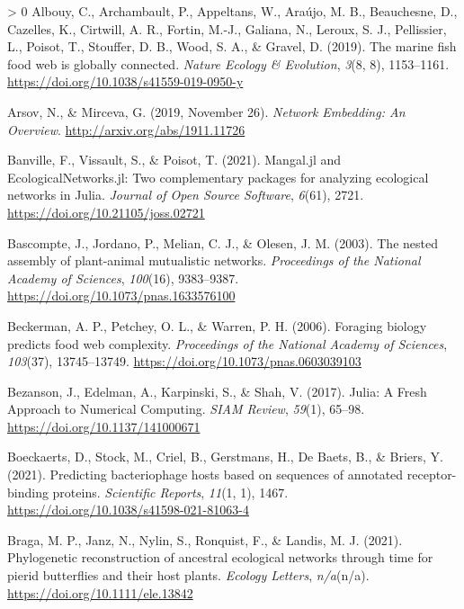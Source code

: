 \documentclass[11pt]{article}
\newlength{\cslhangindent}
\newenvironment{CSLReferences}[3] %
 {%
  \setlength{\parindent}{0pt}
  \ifodd #1 \everypar{\setlength{\hangindent}{\cslhangindent}}\ignorespaces\fi
  \ifnum #2 > 0
  \setlength{\parskip}{#2\baselineskip}
  \fi
 }%
 {}
\begin{document}
\hypertarget{refs}{}
\begin{CSLReferences}{1}{0}
\leavevmode\hypertarget{ref-Albouy2019MarFis}{}%
Albouy, C., Archambault, P., Appeltans, W., Araújo, M. B., Beauchesne,
D., Cazelles, K., Cirtwill, A. R., Fortin, M.-J., Galiana, N., Leroux,
S. J., Pellissier, L., Poisot, T., Stouffer, D. B., Wood, S. A., \&
Gravel, D. (2019). The marine fish food web is globally connected.
\emph{Nature Ecology \& Evolution}, \emph{3}(8, 8), 1153--1161.
\url{https://doi.org/10.1038/s41559-019-0950-y}

\leavevmode\hypertarget{ref-Arsov2019NetEmb}{}%
Arsov, N., \& Mirceva, G. (2019, November 26). \emph{Network Embedding:
An Overview}. \url{http://arxiv.org/abs/1911.11726}

\leavevmode\hypertarget{ref-Banville2021ManJl}{}%
Banville, F., Vissault, S., \& Poisot, T. (2021). Mangal.jl and
EcologicalNetworks.jl: Two complementary packages for analyzing
ecological networks in Julia. \emph{Journal of Open Source Software},
\emph{6}(61), 2721. \url{https://doi.org/10.21105/joss.02721}

\leavevmode\hypertarget{ref-Bascompte2003NesAss}{}%
Bascompte, J., Jordano, P., Melian, C. J., \& Olesen, J. M. (2003). The
nested assembly of plant-animal mutualistic networks. \emph{Proceedings
of the National Academy of Sciences}, \emph{100}(16), 9383--9387.
\url{https://doi.org/10.1073/pnas.1633576100}

\leavevmode\hypertarget{ref-Beckerman2006ForBio}{}%
Beckerman, A. P., Petchey, O. L., \& Warren, P. H. (2006). Foraging
biology predicts food web complexity. \emph{Proceedings of the National
Academy of Sciences}, \emph{103}(37), 13745--13749.
\url{https://doi.org/10.1073/pnas.0603039103}

\leavevmode\hypertarget{ref-Bezanson2017JulFre}{}%
Bezanson, J., Edelman, A., Karpinski, S., \& Shah, V. (2017). Julia: A
Fresh Approach to Numerical Computing. \emph{SIAM Review}, \emph{59}(1),
65--98. \url{https://doi.org/10.1137/141000671}

\leavevmode\hypertarget{ref-Boeckaerts2021PreBac}{}%
Boeckaerts, D., Stock, M., Criel, B., Gerstmans, H., De Baets, B., \&
Briers, Y. (2021). Predicting bacteriophage hosts based on sequences of
annotated receptor-binding proteins. \emph{Scientific Reports},
\emph{11}(1, 1), 1467. \url{https://doi.org/10.1038/s41598-021-81063-4}

\leavevmode\hypertarget{ref-Braga2021PhyRec}{}%
Braga, M. P., Janz, N., Nylin, S., Ronquist, F., \& Landis, M. J.
(2021). Phylogenetic reconstruction of ancestral ecological networks
through time for pierid butterflies and their host plants. \emph{Ecology
Letters}, \emph{n/a}(n/a). \url{https://doi.org/10.1111/ele.13842}


\end{CSLReferences}
\end{document}
